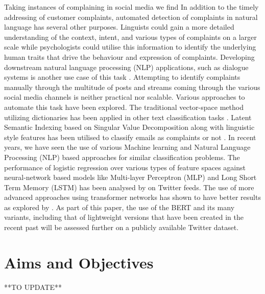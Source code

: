 Taking instances of complaining in social media we find 
\newline \newline
In addition to the timely addressing of customer complaints, automated detection of complaints in natural language has several other purposes. Linguists could gain a more detailed understanding of the context, intent, and various types of complaints on a larger scale while psychologists could utilise this information to identify the underlying human traits that drive the behaviour and expression of complaints. Developing downstream natural language processing (NLP) applications, such as dialogue systems is another use case of this task \cite{preotiuc-pietro_automatically_2019}.
\newline \newline
Attempting to identify complaints manually through the multitude of posts and streams coming through the various social media channels is neither practical nor scalable. Various approaches to automate this task have been explored. The traditional vector-space method utilizing dictionaries has been applied in other text classification tasks \cite{liang_dictionary-based_2006}. Latent Semantic Indexing based on Singular Value Decomposition along with linguistic style features has been utilised to classify emails as complaints or not \cite{coussement_improving_2008}. In recent years, we have seen the use of various Machine learning and Natural Language Processing (NLP) based approaches for similar classification problems. The performance of logistic regression over various types of feature spaces against neural-network based models like Multi-layer Perceptron (MLP) and Long Short Term Memory (LSTM) has been analysed by \cite{preotiuc-pietro_automatically_2019} on Twitter feeds. The use of more advanced approaches using transformer networks has shown to have better results as explored by \cite{jin_complaint_2020}. As part of this paper, the use of the BERT and its many variants, including that of lightweight versions that have been created in the recent past will be assessed further on a publicly available Twitter dataset.

\section{Aims and Objectives}

**TO UPDATE**

